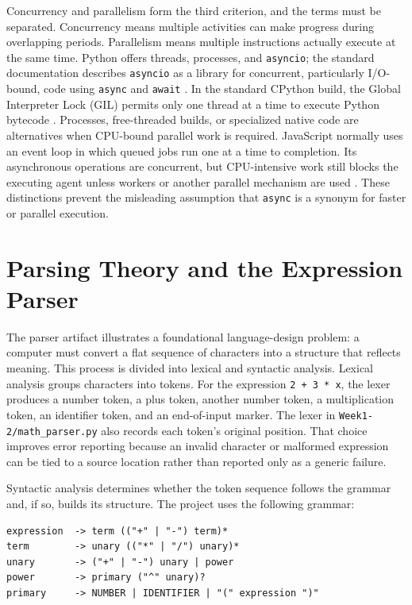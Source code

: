 \documentclass[12pt]{article}
\begin{document}
Concurrency and parallelism form the third criterion, and the terms must be separated. Concurrency means multiple activities can make progress during overlapping periods. Parallelism means multiple instructions actually execute at the same time. Python offers threads, processes, and \texttt{asyncio}; the standard documentation describes \texttt{asyncio} as a library for concurrent, particularly I/O-bound, code using \texttt{async} and \texttt{await} \cite{ref5}. In the standard CPython build, the Global Interpreter Lock (GIL) permits only one thread at a time to execute Python bytecode \cite{ref6}. Processes, free-threaded builds, or specialized native code are alternatives when CPU-bound parallel work is required. JavaScript normally uses an event loop in which queued jobs run one at a time to completion. Its asynchronous operations are concurrent, but CPU-intensive work still blocks the executing agent unless workers or another parallel mechanism are used \cite{ref7}. These distinctions prevent the misleading assumption that \texttt{async} is a synonym for faster or parallel execution.


\section{Parsing Theory and the Expression Parser}

The parser artifact illustrates a foundational language-design problem: a computer must convert a flat sequence of characters into a structure that reflects meaning. This process is divided into lexical and syntactic analysis. Lexical analysis groups characters into tokens. For the expression \texttt{2\ +\ 3\ *\ x}, the lexer produces a number token, a plus token, another number token, a multiplication token, an identifier token, and an end-of-input marker. The lexer in \texttt{Week1-2/math\_parser.py} also records each token's original position. That choice improves error reporting because an invalid character or malformed expression can be tied to a source location rather than reported only as a generic failure.


Syntactic analysis determines whether the token sequence follows the grammar and, if so, builds its structure. The project uses the following grammar:


\begin{lstlisting}
expression  -> term (("+" | "-") term)*
term        -> unary (("*" | "/") unary)*
unary       -> ("+" | "-") unary | power
power       -> primary ("^" unary)?
primary     -> NUMBER | IDENTIFIER | "(" expression ")"
\end{lstlisting}
\end{document}

